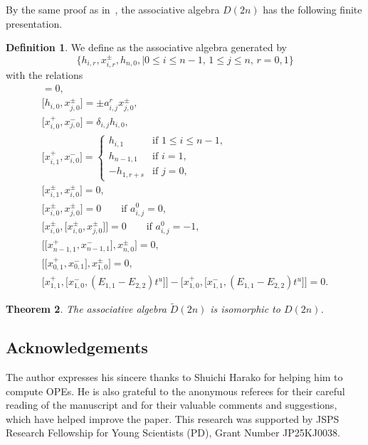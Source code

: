 \documentclass[pdftex]{sigma}
\numberwithin{equation}{section}
\newtheorem{Theorem}{Theorem}[section]
\theoremstyle{definition}
\newtheorem{Definition}[Theorem]{Definition}
\begin{document}
By the same proof as in~\cite[Section 4]{HU}, the associative algebra $D(2n)$ has the following finite presentation.
\begin{Definition}
We define  as the associative algebra generated by
\begin{equation*}
\bigl\{h_{i,r},x^\pm_{i,r},h_{n,0},\mid0\leq i\leq n-1,\,1\leq j\leq n,\,r=0,1\bigr\}
\end{equation*}
with the relations
\begin{gather*}
[h_{i,r},h_{j,s}]=0,\\
\bigl[h_{i,0},x^\pm_{j,0}\bigr]=\pm a^r_{i,j}x^\pm_{j,0},\\
\bigl[x^+_{i,0},x^-_{j,0}\bigr]=\delta_{i,j}h_{i,0},\\
\bigl[x^+_{i,1},x^-_{i,0}\bigr]=\begin{cases}
h_{i,1}&\text{if }1\leq i\leq n-1,\\
h_{n-1,1}&\text{if }i=1,\\
-h_{1,r+s}&\text{if }j=0,
\end{cases}\\
\bigl[x^\pm_{i,1},x^\pm_{i,0}\bigr]=0,\\
\bigl[x^\pm_{i,0},x^\pm_{j,0}\bigr]=0\qquad \text{if }a^0_{i,j}=0,\\
\bigl[x^\pm_{i,0},\bigl[x^\pm_{i,0},x^\pm_{j,0}\bigr]\bigr]=0\qquad \text{if }a^0_{i,j}=-1,\\
\bigl[\bigl[x^+_{n-1,1},x^-_{n-1,1}\bigr],x^\pm_{n,0}\bigr]=0,\\
\bigl[\bigl[x^+_{0,1},x^-_{0,1}\bigr],x^\pm_{1,0}\bigr]=0,\\
\bigl[x^+_{1,1},\bigl[x^-_{1,0},(E_{1,1}-E_{2,2})t^u\bigr]\bigr]-\bigl[x^+_{1,0},\bigl[x^-_{1,1},(E_{1,1}-E_{2,2})t^u\bigr]\bigr]=0.
\end{gather*}
\end{Definition}
\begin{Theorem}%
The associative algebra $\widetilde{D}(2n)$ is isomorphic to $D(2n)$.
\end{Theorem}

\subsection*{Acknowledgements}
The author expresses his sincere thanks to Shuichi Harako for helping him to compute OPEs. He is also grateful to the anonymous referees for their careful reading of the manuscript and for their valuable comments and suggestions, which have helped improve the paper. This research was supported by JSPS Research Fellowship for Young Scientists (PD), Grant Number JP25KJ0038.
\end{document}
